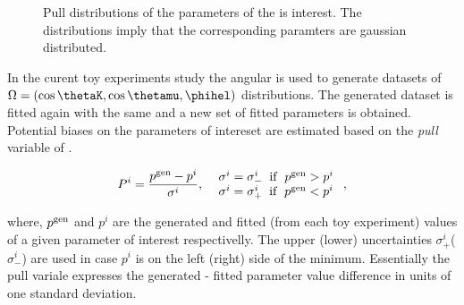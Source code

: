 \begin{figure}[h]
  \centering
  \begin{subfigure}{0.5\textwidth}
    \scalebox{0.60}{}
    \caption{}
    \label{pull_ACP0}
  \end{subfigure}%
  \hfill%
  \begin{subfigure}{0.5\textwidth}
    \scalebox{0.60}{}
    \caption{}
    \label{pull_ACPperp}
  \end{subfigure}
  \begin{subfigure}{0.5\textwidth}
    \scalebox{0.60}{}
    \caption{}
    \label{pull_ACPpar}
  \end{subfigure}%
  \hfill%
  \begin{subfigure}{0.5\textwidth}
    \scalebox{0.60}{}
    \caption{}
    \label{pull_ACPS}
  \end{subfigure}
\caption{Pull distributions of the parameters of the \Acp{i} interest. The distributions imply that the corresponding paramters are gaussian distributed.}
\label{pull_acp}
\end{figure}

In the curent toy experiments study the angular \pdf is used to generate datasets of $\Omega = (\cos\thetaK,\cos\thetamu,\phihel)$ 
distributions. The generated dataset is fitted again with the same \pdf and a new set of fitted parameters is obtained. Potential
biases on the parameters of intereset are estimated based on the {\it pull} variable of .

\begin{equation}
P^i = \frac{p^{\rm gen} - p^i}{ \sigma^i },\;\;\left. 
  \begin{array}{ll}
    \sigma^i = \sigma^i_- \;\;{\rm if}\;\; p^{\rm gen} > p^i  \\
    \sigma^i = \sigma^i_+ \;\;{\rm if}\;\; p^{\rm gen} < p^i 
  \end{array} \right. ,
\label{pull_def}
\end{equation}

\noindent where, $p^{\rm gen}$ and $p^i$ are the generated and fitted (from each toy experiment) values of a given parameter of interest
respectivelly. The upper (lower) uncertainties $\sigma^i_+$($\sigma^i_-$) are used in case $p^i$ is on the left (right) side of the minimum.
Essentially the pull variale expresses the generated - fitted parameter value difference in units of one standard deviation. 

